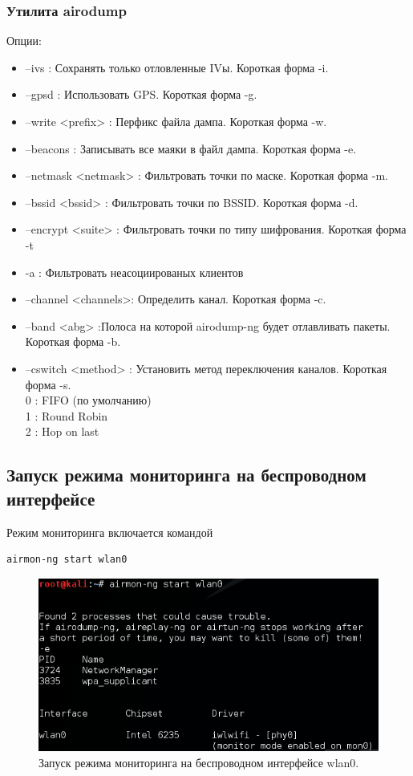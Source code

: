 \documentclass[a4paper, 14pt]{article}				%
\begin{document}
\subsubsection{Утилита airodump}
Опции:
\begin{itemize}
\item{--ivs : Сохранять только отловленные IVы. Короткая форма -i.}
\item{--gpsd : Использовать GPS. Короткая форма -g.}
\item{--write <prefix> : Перфикс файла дампа. Короткая форма -w.}
\item{--beacons : Записывать все маяки в файл дампа. Короткая форма -e.}
\item{--netmask <netmask> : Фильтровать точки по маске. Короткая форма -m.}
\item{--bssid <bssid> : Фильтровать точки по BSSID. Короткая форма -d.}
\item{--encrypt <suite> : Фильтровать точки по типу шифрования. Короткая форма -t}
\item{-a : Фильтровать неасоциированых клиентов}
\item{--channel <channels>: Определить канал. Короткая форма -c.}
\item{--band <abg> :Полоса на которой airodump-ng будет отлавливать пакеты. Короткая форма -b.}
\item{--cswitch <method> : Установить метод переключения каналов. Короткая форма -s. \\
0 : FIFO (по умолчанию)\\
1 : Round Robin\\
2 : Hop on last}
\end{itemize}



\subsection{Запуск режима мониторинга на беспроводном интерфейсе}
Режим мониторинга включается командой
\begin{Verbatim}[frame=single]
airmon-ng start wlan0
\end{Verbatim}

\begin{figure}[h!]
\centering
\includegraphics[width=\textwidth]{rsrc/lab6_airmon_start}
\caption{Запуск режима мониторинга на беспроводном интерфейсе wlan0.}
\end{figure}
\end{document}
